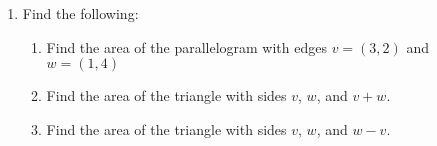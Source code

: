 \begin{enumerate}
    \item Find the following:
        \begin{enumerate}[label=\alph*.]
            \item Find the area of the parallelogram with edges $v=(3,2)$
                and $w=(1,4)$
            \item Find the area of the triangle with sides $v$, $w$, and
                $v+w$. 
            \item Find the area of the triangle with sides $v$, $w$, and $w-v$.
        \end{enumerate}
\end{enumerate}
